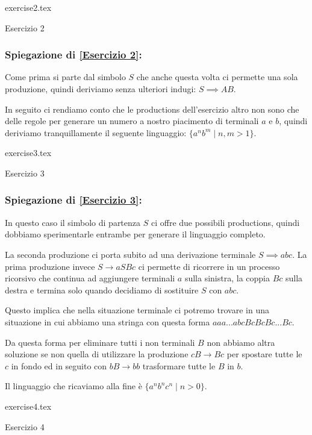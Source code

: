 \documentclass[class=book, crop=false, oneside, 12pt]{standalone}
\begin{document}
\begin{table}[H]
	\centering
	{exercise2.tex}
    \caption{Esercizio 2}
    \label{Esercizio 2}
\end{table}
\subsubsection*{Spiegazione di \ref{Esercizio 2}:}
Come prima si parte dal simbolo \(S\) che anche questa volta ci permette una sola produzione, quindi deriviamo senza ulteriori indugi: \(S \implies AB\).

In seguito ci rendiamo conto che le productions dell'esercizio altro non sono che delle regole per generare un numero a nostro piacimento di terminali \(a\) e \(b\), quindi deriviamo tranquillamente il seguente linguaggio: \(\{a^n b^m \mid n,m>1\}\).

\begin{table}[H]
	\centering
	{exercise3.tex}
    \caption{Esercizio 3}
    \label{Esercizio 3}
\end{table}
\subsubsection*{Spiegazione di \ref{Esercizio 3}:}
In questo caso il simbolo di partenza \(S\) ci offre due possibili productions, quindi dobbiamo sperimentarle entrambe per generare il linguaggio completo.

La seconda produzione ci porta subito ad una derivazione terminale \(S \implies abc\).
La prima produzione invece \(S \to aSBc\) ci permette di ricorrere in un processo ricorsivo che continua ad aggiungere terminali \(a\) sulla sinistra, la coppia \(Bc\) sulla destra e termina solo quando decidiamo di sostituire \(S\) con \(abc\).

Questo implica che nella situazione terminale ci potremo trovare in una situazione in cui abbiamo una stringa con questa forma \(aaa...abcBcBcBc...Bc\).

Da questa forma per eliminare tutti i non terminali \(B\) non abbiamo altra soluzione se non quella di utilizzare la produzione \(cB \to Bc\) per spostare tutte le \(c\) in fondo ed in seguito con \(bB \to bb\) trasformare tutte le \(B\) in \(b\).

Il linguaggio che ricaviamo alla fine è \(\{a^nb^nc^n \mid n>0\}\).

\begin{table}[H]
	\centering
	{exercise4.tex}
    \caption{Esercizio 4}
    \label{Esercizio 4}
\end{table}
\end{document}
